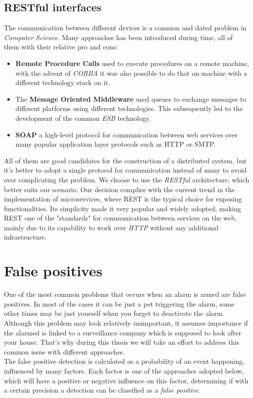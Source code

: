 \subsection{RESTful interfaces}
The communication between different devices is a common and dated
problem in \textit{Computer Science}. Many approaches has been introduced
during time, all of them with their relative pro and cons:
\pagebreak
\begin{itemize}
  \item \textbf{Remote Procedure Calls} used to execute procedures on a remote machine,
  with the advent of \textit{CORBA} it was also possible to do that on machine
  with a different technology stack on it.
  \item The \textbf{Message Oriented Middleware} used queues to exchange messages to
  different platforms using different technologies. This subsequently led to
  the development of the common \textit{ESB} technology.
  \item \textbf{SOAP} a high-level protocol for communication between web services
  over many popular application layer protocols such as HTTP or SMTP.
\end{itemize}

All of them are good candidates for the construction of a distributed system,
but it's better to adopt a single protocol for communication instead of many to
avoid over complicating the problem.
We choose to use the \textit{RESTful} architecture, which
better suits our scenario. Our decision complies with the current trend in the
implementation of microservices, where REST is the typical choice for exposing
functionalities. Its simplicity made it very popular and widely adopted, making
REST one of the "standards" for communication between services on the web, mainly
due to its capability to work over \textit{HTTP} without any additional infrastructure.



\section{False positives}

One of the most common problems that occurs when an alarm
is armed are false positives. In most of the cases it can be just a pet
triggering the alarm, some other times may be just yourself when you forget to
deactivate the alarm.\\
Although this problem may look relatively unimportant, it assumes importance if the
alarmed is linked to a surveillance company which is supposed to look after your house.
That's why during this thesis we will take an effort to address this common issue with different
approaches.\\
The false positive detection is calculated as a probability of an event happening, influenced
by many factors. Each factor is one of the approaches adopted below, which will have a positive or
negative influence on this factor, determining if with a certain precision a detection can be classified
as a \textit{false positive}.
 \pagebreak
